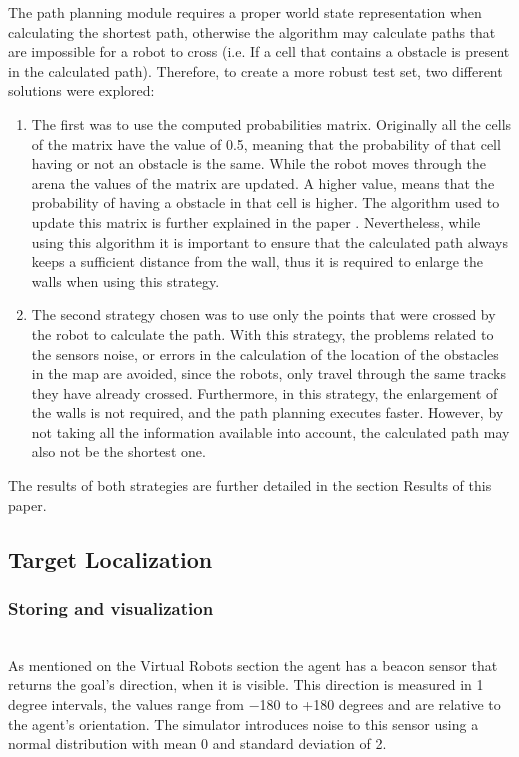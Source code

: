 \documentclass[oribibl]{llncs}
\begin{document}
The path planning module requires a proper world state representation when calculating the shortest path, otherwise the algorithm may calculate paths that are impossible for a robot to cross (i.e. If a cell that contains a obstacle is present in the calculated path). Therefore, to create a more robust test set, two different solutions were explored:
\begin{enumerate}
\item The first was to use the computed probabilities matrix. Originally all the cells of the matrix have the value of 0.5, meaning that the probability of that cell having or not an obstacle is the same. While the robot moves through the arena the values of the matrix are updated. A higher value, means that the probability of having a obstacle in that cell is higher. The algorithm used to update this matrix is further explained in the paper \cite{MoreiraBabo2012}. Nevertheless, while using this algorithm it is important to ensure that the calculated path always keeps a sufficient distance from the wall, thus it is required to enlarge the walls when using this strategy.

\item The second strategy chosen was to use only the points that were crossed by the robot to calculate the path. With this strategy, the problems related to the sensors noise, or errors in the calculation of the location of the obstacles in the map are avoided, since the robots, only travel through the same tracks they have already crossed. Furthermore, in this strategy, the enlargement of the walls is not required, and the path planning executes faster. However, by not taking all the information available into account, the calculated path may also not be the shortest one.
\end{enumerate}

The results of both strategies are further detailed in the section Results of this paper.

\subsection{Target Localization}
\label{sec:target-loc}
\subsubsection{Storing and visualization}\hfill \\

As mentioned on the Virtual Robots section the agent has a beacon
sensor that returns the goal's direction, when it is visible. This direction
is measured in 1 degree intervals, the values range from $-$180 to +180 degrees and
are relative to the agent's orientation. The simulator introduces noise to this sensor
using a normal distribution with mean 0 and standard deviation of 2.
\end{document}
